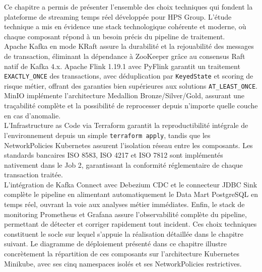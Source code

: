 Ce chapitre a permis de présenter l'ensemble des choix techniques qui fondent la plateforme de streaming temps réel développée pour HPS Group. L'étude technique a mis en évidence une stack technologique cohérente et moderne, où chaque composant répond à un besoin précis du pipeline de traitement.
\\[0.3cm]
Apache Kafka en mode KRaft assure la durabilité et la rejouabilité des messages de transaction, éliminant la dépendance à ZooKeeper grâce au consensus Raft natif de Kafka 4.x. Apache Flink 1.19.1 avec PyFlink garantit un traitement \texttt{EXACTLY\_ONCE} des transactions, avec déduplication par \texttt{KeyedState} et scoring de risque métier, offrant des garanties bien supérieures aux solutions \texttt{AT\_LEAST\_ONCE}. MinIO implémente l'architecture Medallion Bronze/Silver/Gold, assurant une traçabilité complète et la possibilité de reprocesser depuis n'importe quelle couche en cas d'anomalie.
\\[0.3cm]
L'Infrastructure as Code via Terraform garantit la reproductibilité intégrale de l'environnement depuis un simple \texttt{terraform apply}, tandis que les NetworkPolicies Kubernetes assurent l'isolation réseau entre les composants. Les standards bancaires ISO 8583, ISO 4217 et ISO 7812 sont implémentés nativement dans le Job 2, garantissant la conformité réglementaire de chaque transaction traitée.
\\[0.3cm]
L'intégration de Kafka Connect avec Debezium CDC et le connecteur JDBC Sink complète le pipeline en alimentant automatiquement le Data Mart PostgreSQL en temps réel, ouvrant la voie aux analyses métier immédiates. Enfin, le stack de monitoring Prometheus et Grafana assure l'observabilité complète du pipeline, permettant de détecter et corriger rapidement tout incident. Ces choix techniques constituent le socle sur lequel s'appuie la réalisation détaillée dans le chapitre suivant. Le diagramme de déploiement présenté dans ce chapitre illustre concrètement la répartition de ces composants sur l'architecture Kubernetes Minikube, avec ses cinq namespaces isolés et ses NetworkPolicies restrictives.

\newpage
